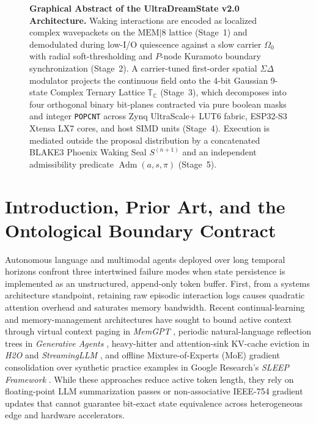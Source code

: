 \documentclass[10pt, twocolumn, a4paper]{article}
\begin{document}
\begin{figure}[t!]
\vspace{-4pt}
\caption{\textbf{Graphical Abstract of the UltraDreamState v2.0 Architecture.} Waking interactions are encoded as localized complex wavepackets on the $\text{MEM}|8$ lattice (Stage~1) and demodulated during low-I/O quiescence against a slow carrier $\Omega_0$ with radial soft-thresholding and $P$-node Kuramoto boundary synchronization (Stage~2). A carrier-tuned first-order spatial $\Sigma\Delta$ modulator projects the continuous field onto the 4-bit Gaussian 9-state Complex Ternary Lattice $\mathbb{T}_{\mathbb{C}}$ (Stage~3), which decomposes into four orthogonal binary bit-planes contracted via pure boolean masks and integer \texttt{POPCNT} across Zynq UltraScale+ LUT6 fabric, ESP32-S3 Xtensa LX7 cores, and host SIMD units (Stage~4). Execution is mediated outside the proposal distribution by a concatenated BLAKE3 Phoenix Waking Seal $S^{(n+1)}$ and an independent admissibility predicate $\operatorname{Adm}(a,s,\pi)$ (Stage~5).}
\label{fig:graphical_abstract}
\end{figure}

\section{Introduction, Prior Art, and the Ontological Boundary Contract}

Autonomous language and multimodal agents deployed over long temporal horizons confront three intertwined failure modes when state persistence is implemented as an unstructured, append-only token buffer. First, from a systems architecture standpoint, retaining raw episodic interaction logs causes quadratic attention overhead and saturates memory bandwidth. Recent continual-learning and memory-management architectures have sought to bound active context through virtual context paging in \textit{MemGPT} \cite{packer2023memgpt}, periodic natural-language reflection trees in \textit{Generative Agents} \cite{park2023generative}, heavy-hitter and attention-sink KV-cache eviction in \textit{H2O} \cite{zhang2023h2o} and \textit{StreamingLLM} \cite{xiao2024streamingllm}, and offline Mixture-of-Experts (MoE) gradient consolidation over synthetic practice examples in Google Research's \textit{SLEEP Framework} \cite{googlesleep2026}. While these approaches reduce active token length, they rely on floating-point LLM summarization passes or non-associative IEEE-754 gradient updates \cite{goldberg1991floating} that cannot guarantee bit-exact state equivalence across heterogeneous edge and hardware accelerators.
\end{document}
